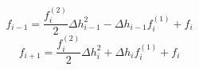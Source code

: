 \begin{equation} 
f_{{i-1}} = \frac{f^{{(2)}}_{i}}{2} \Delta h_{{i-1}}^{2} - \Delta h_{{i-1}} f^{{(1)}}_{i} + f_{i}
 \end{equation} 
\begin{equation} 
f_{{i+1}} = \frac{f^{{(2)}}_{i}}{2} \Delta h_{{i}}^{2} + \Delta h_{{i}} f^{{(1)}}_{i} + f_{i}
 \end{equation} 
